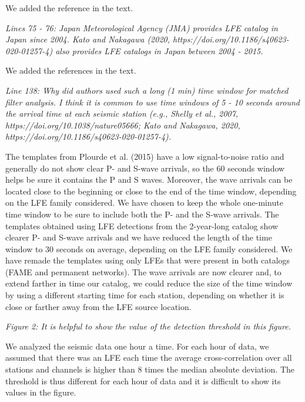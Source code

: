 \documentclass[letterpaper, 12pt]{article}
\begin{document}
\bigskip

We added the reference in the text.

\bigskip

\textit{Lines 75 - 76: Japan Meteorological Agency (JMA) provides LFE catalog in Japan since 2004. Kato and Nakagawa (2020, https://doi.org/10.1186/s40623-020-01257-4) also provides LFE catalogs in Japan between 2004 - 2015.}

\bigskip

We added the references in the text.

\bigskip

\textit{Line 138: Why did authors used such a long (1 min) time window for matched filter analysis. I think it is common to use time windows of 5 - 10 seconds around the arrival time at each seismic station (e.g., Shelly et al., 2007, https://doi.org/10.1038/nature05666; Kato and Nakagawa, 2020, https://doi.org/10.1186/s40623-020-01257-4).}

\bigskip

The templates from Plourde et al. (2015) have a low signal-to-noise ratio and generally do not show clear P- and S-wave arrivals, so the 60 seconds window helps be sure it contains the P and S waves. Moreover, the wave arrivals can be located close to the beginning or close to the end of the time window, depending on the LFE family considered. We have chosen to keep the whole one-minute time window to be sure to include both the P- and the S-wave arrivals. The templates obtained using LFE detections from the 2-year-long catalog show clearer P- and S-wave arrivals and we have reduced the length of the time window to 30 seconds on average, depending on the LFE family considered. We have remade the templates using only LFEs that were present in both catalogs (FAME and permanent networks). The wave arrivals are now clearer and, to extend farther in time our catalog, we could reduce the size of the time window by using a different starting time for each station, depending on whether it is close or farther away from the LFE source location. 

\bigskip

\textit{Figure 2: It is helpful to show the value of the detection threshold in this figure.}

\bigskip

We analyzed the seismic data one hour a time. For each hour of data, we assumed that there was an LFE each time the average cross-correlation over all stations and channels is higher than 8 times the median absolute deviation. The threshold is thus different for each hour of data and it is difficult to show its values in the figure.
\end{document}
